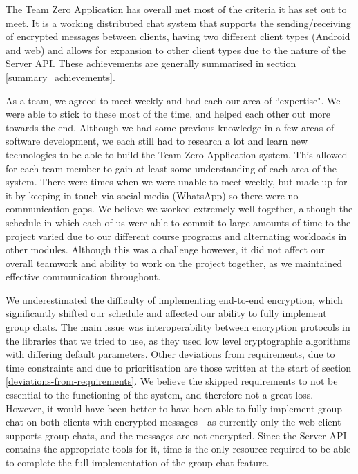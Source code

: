 The Team Zero Application has overall met most of the criteria it has set out to meet. It is a working distributed chat system that supports the sending/receiving of encrypted messages between clients, having two different client types (Android and web) and allows for expansion to other client types due to the nature of the Server API. These achievements are generally summarised in section \ref{summary_achievements}.

As a team, we agreed to meet weekly and had each our area of ``expertise". We were able to stick to these most of the time, and helped each other out more towards the end. Although we had some previous knowledge in a few areas of software development, we each still had to research a lot and learn new technologies to be able to build the Team Zero Application system. This allowed for each team member to gain at least some understanding of each area of the system. There were times when we were unable to meet weekly, but made up for it by keeping in touch via social media (WhatsApp) so there were no communication gaps. We believe we worked extremely well together, although the schedule in which each of us were able to commit to large amounts of time to the project varied due to our different course programs and alternating workloads in other modules. Although this was a challenge however, it did not affect our overall teamwork and ability to work on the project together, as we maintained effective communication throughout.

We underestimated the difficulty of implementing end-to-end encryption, which significantly shifted our schedule and affected our ability to fully implement group chats. The main issue was interoperability between encryption protocols in the libraries that we tried to use, as they used low level cryptographic algorithms with differing default parameters. Other deviations from requirements, due to time constraints and due to prioritisation are those written at the start of section \ref{deviations-from-requirements}. We believe the skipped requirements to not be essential to the functioning of the system, and therefore not a great loss. However, it would have been better to have been able to fully implement group chat on both clients with encrypted messages - as currently only the web client supports group chats, and the messages are not encrypted. Since the Server API contains the appropriate tools for it, time is the only resource required to be able to complete the full implementation of the group chat feature. 


